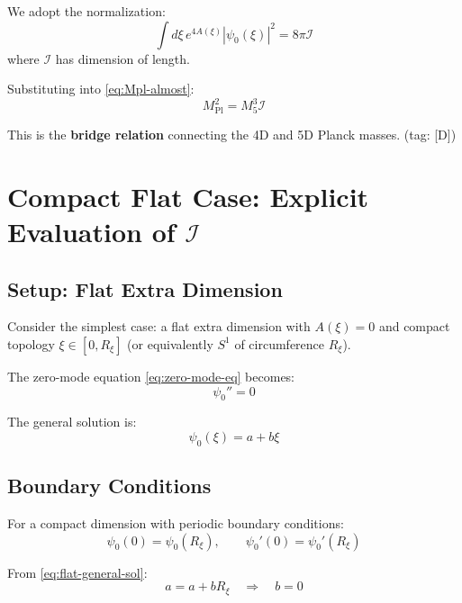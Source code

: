 \documentclass[11pt,a4paper]{article}
\newcommand{\Rxi}{R_\xi}
\newcommand{\Mpl}{M_{\mathrm{Pl}}}
\newcommand{\Mfive}{M_5}
\newcommand{\calI}{\mathcal{I}}
\begin{document}
We adopt the normalization:
\begin{equation}
\int d\xi\, e^{4A(\xi)} |\psi_0(\xi)|^2 = 8\pi \calI
\label{eq:norm-convention}
\end{equation}
where $\calI$ has dimension of length.

Substituting into \eqref{eq:Mpl-almost}:
\begin{equation}
\boxed{\Mpl^2 = \Mfive^3 \calI}
\label{eq:bridge-relation}
\end{equation}

This is the \textbf{bridge relation} connecting the 4D and 5D Planck masses.
\hfill (tag: [D])

\section{Compact Flat Case: Explicit Evaluation of $\calI$}

\subsection{Setup: Flat Extra Dimension}

Consider the simplest case: a flat extra dimension with $A(\xi) = 0$ and
compact topology $\xi \in [0, \Rxi]$ (or equivalently $S^1$ of circumference $\Rxi$).

The zero-mode equation \eqref{eq:zero-mode-eq} becomes:
\begin{equation}
\psi_0'' = 0
\label{eq:flat-zero-mode-eq}
\end{equation}

The general solution is:
\begin{equation}
\psi_0(\xi) = a + b\xi
\label{eq:flat-general-sol}
\end{equation}

\subsection{Boundary Conditions}

For a compact dimension with periodic boundary conditions:
\begin{equation}
\psi_0(0) = \psi_0(\Rxi), \qquad \psi_0'(0) = \psi_0'(\Rxi)
\label{eq:periodic-bc}
\end{equation}

From \eqref{eq:flat-general-sol}:
\begin{equation}
a = a + b\Rxi \quad \Rightarrow \quad b = 0
\label{eq:bc-constraint}
\end{equation}
\end{document}
